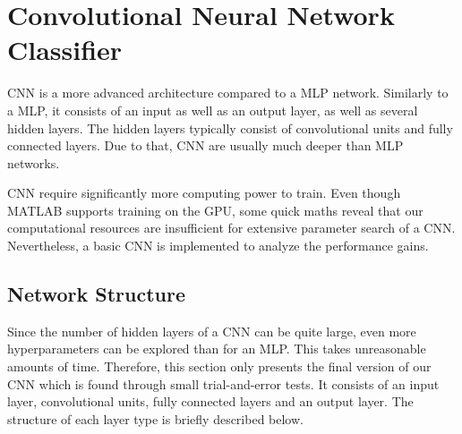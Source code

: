 \section{Convolutional Neural Network Classifier} \label{sec:CNN}
	\pagestyle{mario}

CNN is a more advanced architecture compared to a MLP network. Similarly to a MLP, it consists of an input as well as an output layer, as well as several hidden layers. The hidden layers typically consist of convolutional units and fully connected layers. Due to that, CNN are usually much deeper than MLP networks.

CNN require significantly more computing power to train. Even though MATLAB supports training on the GPU, some quick maths reveal that our computational resources are insufficient for extensive parameter search of a CNN. Nevertheless, a basic CNN is implemented to analyze the performance gains. 

\subsection{Network Structure}

Since the number of hidden layers of a CNN can be quite large, even more hyperparameters can be explored than for an MLP. This takes unreasonable amounts of time. Therefore, this section only presents the final version of our CNN which is found through small trial-and-error tests. It consists of an input layer, convolutional units, fully connected layers and an output layer. The structure of each layer type is briefly described below.

